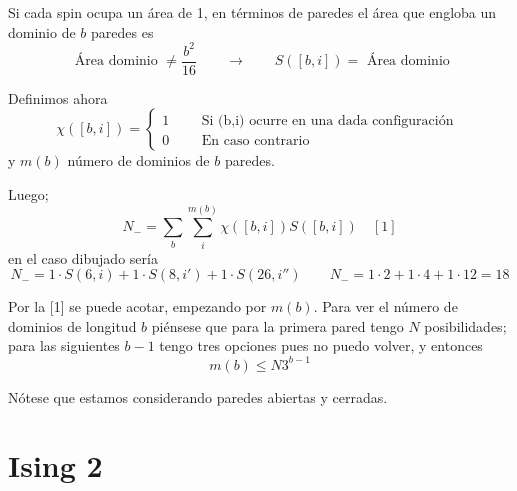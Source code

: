 \documentclass[10pt,oneside]{CBFT_book}
\begin{document}
Si cada spin ocupa un área de 1, en términos de paredes el área que engloba un dominio de $b$ paredes
es 
\[
	\text{ Área dominio } \neq \frac{b^2}{16} \qquad \rightarrow \qquad S([b,i]) = \text{ Área dominio}
\]

Definimos ahora 
\[
	\chi([b,i]) = \begin{cases}
	              1 \qquad \text{ Si (b,i) ocurre en una dada configuración } \\
	              0 \qquad \text{ En caso contrario}
	             \end{cases}
\]
y $m(b)$ número de dominios de $b$ paredes.

Luego;
\[
	\boxed{ N_- = \sum_b \sum_i^{m(b)} \chi([b,i]) S([b,i]) } \quad [1]
\]
en el caso dibujado sería
\[
	N_- = 1 \cdot S(6,i) + 1 \cdot S(8,i') + 1 \cdot S(26,i'') \qquad 
	N_- = 1 \cdot  2 + 1 \cdot  4 + 1 \cdot 12 = 18
\]

Por la [1] se puede acotar, empezando por $m(b)$. Para ver el número de dominios de longitud $b$ piénsese que 
para la primera pared tengo $N$ posibilidades; para las siguientes $b-1$ tengo tres opciones pues no puedo volver,
y entonces 
\[
	m(b) \leq N 3^{b-1}
\]

Nótese que estamos considerando paredes abiertas y cerradas.









\section{Ising 2}



\end{document}
